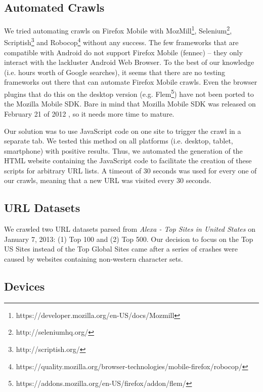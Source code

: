 \documentclass{acm_proc_article-sp}
\begin{document}
\subsection{Automated Crawls}

We tried automating crawls on Firefox Mobile with MozMill\footnote{https://developer.mozilla.org/en-US/docs/Mozmill}, Selenium\footnote{http://seleniumhq.org/}, Scriptish\footnote{http://scriptish.org/} and Robocop\footnote{https://quality.mozilla.org/browser-technologies/mobile-firefox/robocop/} without any success. The few frameworks that are compatible with Android do not support Firefox Mobile (fennec) -- they only interact with the lackluster Android Web Browser. To the best of our knowledge (i.e. hours worth of Google searches), it seems that there are no testing frameworks out there that can automate Firefox Mobile crawls. Even the browser plugins that do this on the desktop version (e.g. Flem\footnote{https://addons.mozilla.org/en-US/firefox/addon/flem/}) have not been ported to the Mozilla Mobile SDK. Bare in mind that Mozilla Mobile SDK was released on February 21 of 2012 \cite{announcing_sdk}, so it needs more time to mature.

Our solution was to use JavaScript code on one site to trigger the crawl in a separate tab. We tested this method on all platforms (i.e. desktop, tablet, smartphone) with positive results. Thus, we automated the generation of the HTML website containing the JavaScript code to facilitate the creation of these scripts for arbitrary URL lists. A timeout of 30 seconds was used for every one of our crawls, meaning that a new URL was visited every 30 seconds.

\subsection{URL Datasets}

We crawled two URL datasets parsed from \emph{Alexa - Top Sites in United States} on January 7, 2013: (1) Top 100 and (2) Top 500. Our decision to focus on the Top US Sites instead of the Top Global Sites came after a series of crashes were caused by websites containing non-western character sets.

\subsection{Devices}
\end{document}

